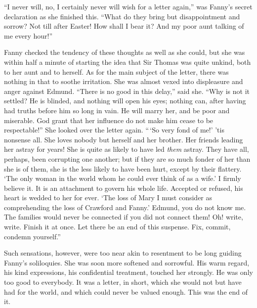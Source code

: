 \documentclass{article}
\begin{document}
``I never will, no, I certainly never will wish for a
letter again,'' was Fanny's secret declaration as she
finished this.  ``What do they bring but disappointment
and sorrow?  Not till after Easter!  How shall I bear it?
And my poor aunt talking of me every hour!''

Fanny checked the tendency of these thoughts as well as
she could, but she was within half a minute of starting
the idea that Sir Thomas was quite unkind, both to her aunt
and to herself.  As for the main subject of the letter,
there was nothing in that to soothe irritation.  She was
almost vexed into displeasure and anger against Edmund.
``There is no good in this delay,'' said she.  ``Why is not
it settled?  He is blinded, and nothing will open his eyes;
nothing can, after having had truths before him so long
in vain.  He will marry her, and be poor and miserable.
God grant that her influence do not make him cease
to be respectable!''  She looked over the letter again.
``\,`So very fond of me!' 'tis nonsense all.  She loves
nobody but herself and her brother.  Her friends leading
her astray for years!  She is quite as likely to have led
\emph{them} astray.  They have all, perhaps, been corrupting
one another; but if they are so much fonder of her than
she is of them, she is the less likely to have been hurt,
except by their flattery.  `The only woman in the world
whom he could ever think of as a wife.'  I firmly
believe it.  It is an attachment to govern his whole life.
Accepted or refused, his heart is wedded to her for ever.
`The loss of Mary I must consider as comprehending the loss
of Crawford and Fanny.'  Edmund, you do not know me.
The families would never be connected if you did not
connect them!  Oh! write, write.  Finish it at once.
Let there be an end of this suspense.  Fix, commit,
condemn yourself.''

Such sensations, however, were too near akin to
resentment to be long guiding Fanny's soliloquies.
She was soon more softened and sorrowful.  His warm regard,
his kind expressions, his confidential treatment,
touched her strongly.  He was only too good to everybody.
It was a letter, in short, which she would not but have had
for the world, and which could never be valued enough.
This was the end of it.
\end{document}
